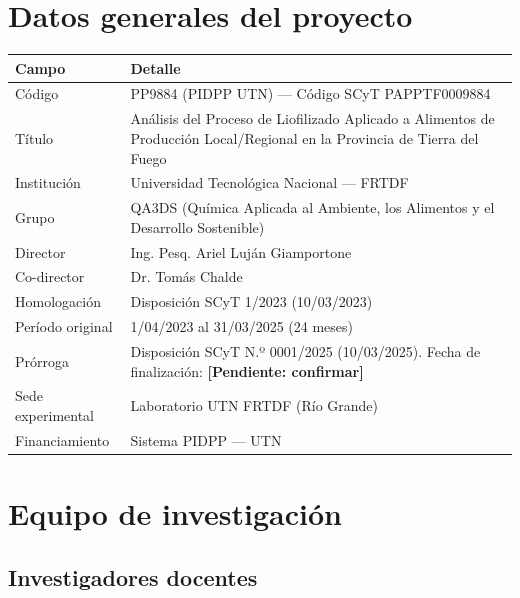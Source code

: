 \documentclass[12pt, a4paper]{article}
\newcommand{\pend}[1]{\textcolor{red!70!black}{\textbf{[Pendiente: #1]}}}
\begin{document}
\vspace{1em}

\tableofcontents
\newpage

\section{Datos generales del proyecto}

\begin{longtable}{p{5cm}p{10cm}}
\toprule
\textbf{Campo} & \textbf{Detalle} \\
\midrule
Código & PP9884 (PIDPP UTN) --- Código SCyT PAPPTF0009884 \\
Título & Análisis del Proceso de Liofilizado Aplicado a Alimentos de Producción Local/Regional en la Provincia de Tierra del Fuego \\
Institución & Universidad Tecnológica Nacional --- FRTDF \\
Grupo & QA3DS (Química Aplicada al Ambiente, los Alimentos y el Desarrollo Sostenible) \\
Director & Ing. Pesq. Ariel Luján Giamportone \\
Co-director & Dr. Tomás Chalde \\
Homologación & Disposición SCyT 1/2023 (10/03/2023) \\
Período original & 1/04/2023 al 31/03/2025 (24 meses) \\
Prórroga & Disposición SCyT N.º 0001/2025 (10/03/2025). Fecha de finalización: \pend{confirmar} \\
Sede experimental & Laboratorio UTN FRTDF (Río Grande) \\
Financiamiento & Sistema PIDPP --- UTN \\
\bottomrule
\end{longtable}

\section{Equipo de investigación}

\subsection{Investigadores docentes}
\end{document}
